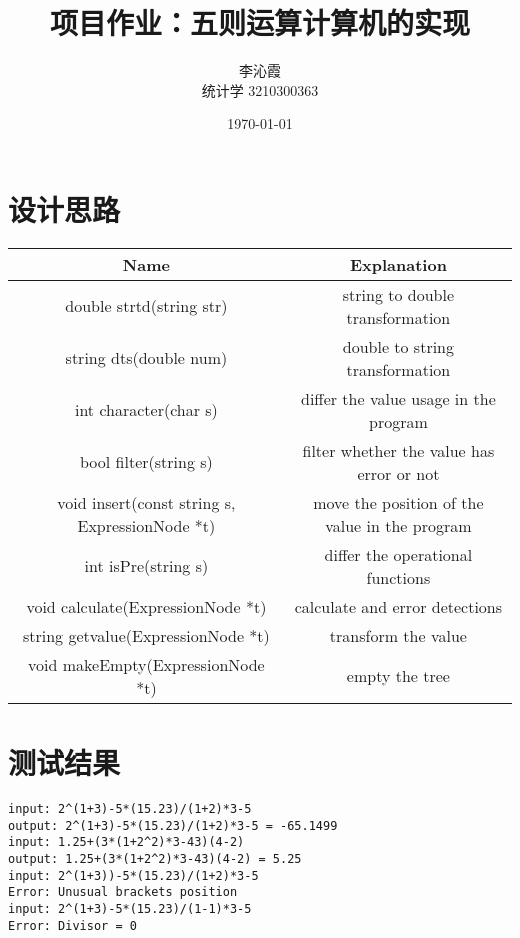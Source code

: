 \documentclass[a4paper]{article}
\title{\textbf{项目作业：五则运算计算机的实现}}
\author{李沁霞 \\ 统计学 3210300363}
\date{\today}
\begin{document}
\maketitle

\section{设计思路}
\begin{flushleft}
\begin{tabular}{|c|c|}
    \hline
    \textbf{Name} & \textbf{Explanation} \\
    \hline
    double strtd(string str) & string to double transformation \\
    string dts(double num) & double to string transformation \\
    int character(char s) & differ the value usage in the program \\
    bool filter(string s) & filter whether the value has error or not\\
    void insert(const string s, ExpressionNode *t) & move the position of the value in the program\\
    int isPre(string s) & differ the operational functions \\
    void calculate(ExpressionNode *t) & calculate and error detections \\
    string getvalue(ExpressionNode *t) & transform the value \\
    void makeEmpty(ExpressionNode *t) & empty the tree\\
    \hline
\end{tabular}
\end{flushleft}

\section{测试结果}
\begin{verbatim}
input: 2^(1+3)-5*(15.23)/(1+2)*3-5
output: 2^(1+3)-5*(15.23)/(1+2)*3-5 = -65.1499
input: 1.25+(3*(1+2^2)*3-43)(4-2)
output: 1.25+(3*(1+2^2)*3-43)(4-2) = 5.25
input: 2^(1+3))-5*(15.23)/(1+2)*3-5
Error: Unusual brackets position
input: 2^(1+3)-5*(15.23)/(1-1)*3-5
Error: Divisor = 0
\end{verbatim}
\end{document}
